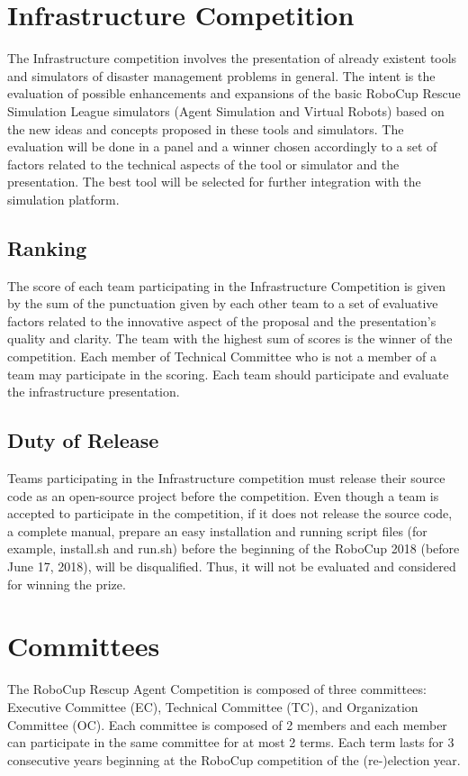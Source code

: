 \documentclass{article}
\begin{document}
\section{Infrastructure Competition}
\label{sec:infrastructure}
The Infrastructure competition involves the presentation of already existent 
tools and simulators of disaster management problems in general. The intent is 
the evaluation of possible enhancements and expansions of the basic RoboCup 
Rescue Simulation League simulators (Agent Simulation and Virtual Robots) based
on the new ideas and concepts proposed in these tools and simulators. The
evaluation will be done in a panel and a winner chosen accordingly to a set of
factors related to the technical aspects of the tool or simulator and the
presentation. The best tool will be selected for further integration with the
simulation platform.
\subsection{Ranking}
The score of each team participating in the Infrastructure Competition is given 
by the sum of the punctuation given by each other team to a set of evaluative 
factors related to the innovative aspect of the proposal and the presentation's 
quality and clarity. The team with the highest sum of scores is the winner of 
the competition. Each member of Technical Committee who is not a member of a 
team may participate in the scoring. Each team should participate and evaluate 
the infrastructure presentation.
\subsection{Duty of Release}
Teams participating in the Infrastructure competition must release their source 
code as an open-source project before the competition. Even though a team is 
accepted to participate in the competition, if it does not release the source 
code, a complete manual, prepare an easy installation and running script files 
(for example, install.sh and run.sh) before the beginning of the RoboCup 2018 
(before June 17, 2018), will be disqualified. Thus, it will not be evaluated 
and considered for winning the prize.
\section{Committees}
\label{sec:committees}
The RoboCup Rescup Agent Competition is composed of three committees:
Executive Committee (EC), Technical Committee (TC), and Organization Committee
(OC). Each committee is composed of 2 members and each member can participate in
the same committee for at most 2 terms. Each term lasts for 3 consecutive years
beginning at the RoboCup competition of the (re-)election year.
\end{document}
